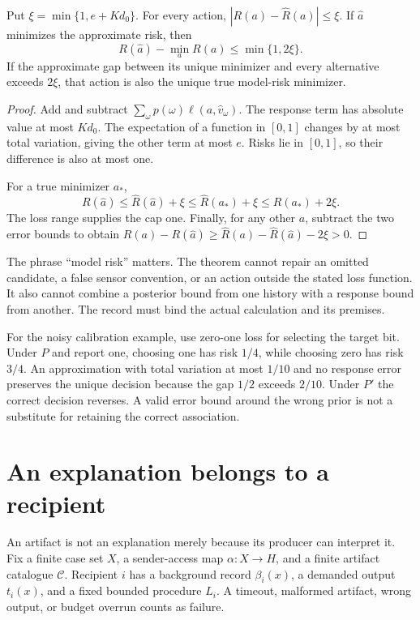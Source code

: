 \begin{theorem}\label{r:risk}
Put $\xi=\min\{1,e+Kd_0\}$. For every action, $|R(a)-\widehat R(a)|\le\xi$. If $\widehat a$ minimizes the approximate risk, then
\[
R(\widehat a)-\min_a R(a)\le\min\{1,2\xi\}.
\]
If the approximate gap between its unique minimizer and every alternative exceeds $2\xi$, that action is also the unique true model-risk minimizer.
\end{theorem}
\begin{proof}
Add and subtract $\sum_\omega p(\omega)\ell(a,\widehat v_\omega)$. The response term has absolute value at most $Kd_0$. The expectation of a function in $[0,1]$ changes by at most total variation, giving the other term at most $e$. Risks lie in $[0,1]$, so their difference is also at most one.

For a true minimizer $a_*$,
\[
R(\widehat a)\le\widehat R(\widehat a)+\xi
\le\widehat R(a_*)+\xi\le R(a_*)+2\xi.
\]
The loss range supplies the cap one. Finally, for any other $a$, subtract the two error bounds to obtain
$R(a)-R(\widehat a)\ge\widehat R(a)-\widehat R(\widehat a)-2\xi>0$.
\end{proof}

The phrase ``model risk'' matters. The theorem cannot repair an omitted candidate, a false sensor convention, or an action outside the stated loss function. It also cannot combine a posterior bound from one history with a response bound from another. The record must bind the actual calculation and its premises.

For the noisy calibration example, use zero-one loss for selecting the target bit. Under $P$ and report one, choosing one has risk $1/4$, while choosing zero has risk $3/4$. An approximation with total variation at most $1/10$ and no response error preserves the unique decision because the gap $1/2$ exceeds $2/10$. Under $P'$ the correct decision reverses. A valid error bound around the wrong prior is not a substitute for retaining the correct association.

\section{An explanation belongs to a recipient}
An artifact is not an explanation merely because its producer can interpret it. Fix a finite case set $X$, a sender-access map $\alpha:X\to H$, and a finite artifact catalogue $\mathcal C$. Recipient $i$ has a background record $\beta_i(x)$, a demanded output $t_i(x)$, and a fixed bounded procedure $L_i$. A timeout, malformed artifact, wrong output, or budget overrun counts as failure.

